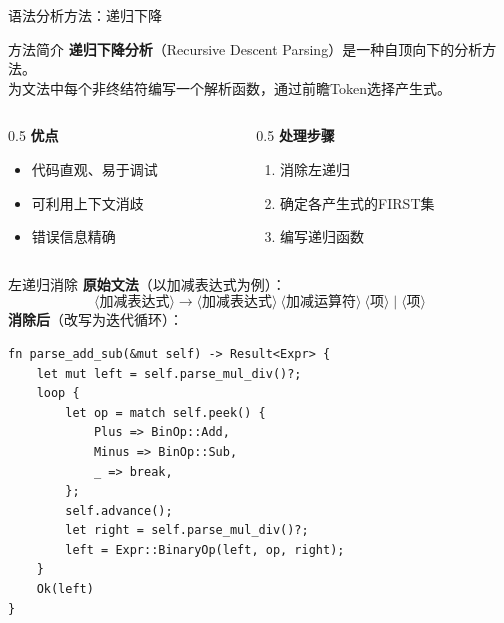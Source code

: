 \documentclass[aspectratio=169]{ctexbeamer}
\begin{document}
\begin{frame}{语法分析方法：递归下降}
    \begin{block}{方法简介}
        \textbf{递归下降分析}（Recursive Descent Parsing）是一种自顶向下的分析方法。\\
        为文法中每个非终结符编写一个解析函数，通过前瞻Token选择产生式。
    \end{block}
    \vfill
    \begin{columns}[T]
    \begin{column}{0.5\textwidth}
        \textbf{优点}
        \begin{itemize}
            \item 代码直观、易于调试
            \item 可利用上下文消歧
            \item 错误信息精确
        \end{itemize}
    \end{column}
    \begin{column}{0.5\textwidth}
        \textbf{处理步骤}
        \begin{enumerate}
            \item 消除左递归
            \item 确定各产生式的FIRST集
            \item 编写递归函数
        \end{enumerate}
    \end{column}
    \end{columns}
\end{frame}

\begin{frame}{左递归消除}
    \textbf{原始文法}（以加减表达式为例）：
    \[
    \langle\text{加减表达式}\rangle \to \langle\text{加减表达式}\rangle\ \langle\text{加减运算符}\rangle\ \langle\text{项}\rangle \mid \langle\text{项}\rangle
    \]
    \vfill
    \textbf{消除后}（改写为迭代循环）：
\begin{lstlisting}[language=RustLike, basicstyle=\tiny\ttfamily]
fn parse_add_sub(&mut self) -> Result<Expr> {
    let mut left = self.parse_mul_div()?;
    loop {
        let op = match self.peek() {
            Plus => BinOp::Add,
            Minus => BinOp::Sub,
            _ => break,
        };
        self.advance();
        let right = self.parse_mul_div()?;
        left = Expr::BinaryOp(left, op, right);
    }
    Ok(left)
}
\end{lstlisting}
\end{frame}
\end{document}
